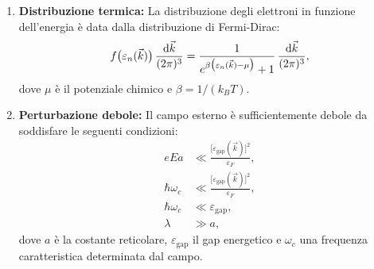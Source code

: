 \begin{enumerate}
    \item \textbf{Distribuzione termica:} La distribuzione degli elettroni in funzione dell'energia è data dalla distribuzione di Fermi-Dirac:
    \[
    f\bigl(\varepsilon_n(\vec{k})\bigr)\, \frac{\text{d}\vec{k}}{(2\pi)^3} = \frac{1}{e^{\beta\bigl(\varepsilon_n(\vec{k})-\mu\bigr)}+1}\, \frac{\text{d}\vec{k}}{(2\pi)^3},
    \]
    dove \(\mu\) è il potenziale chimico e \(\beta = 1/(k_BT)\).
    \item \textbf{Perturbazione debole:} Il campo esterno è sufficientemente debole da soddisfare le seguenti condizioni:
    \begin{equation}
        \begin{split}
            eEa &\ll \frac{\bigl[\varepsilon_{\text{gap}}(\vec{k})\bigr]^2}{\varepsilon_F},\\[1mm]
            \hbar\omega_c &\ll \frac{\bigl[\varepsilon_{\text{gap}}(\vec{k})\bigr]^2}{\varepsilon_F},\\[1mm]
            \hbar\omega_c &\ll \varepsilon_{\text{gap}},\\[1mm]
            \lambda &\gg a,
        \end{split}
    \end{equation}
    dove \(a\) è la costante reticolare, \(\varepsilon_{\text{gap}}\) il gap energetico e \(\omega_c\) una frequenza caratteristica determinata dal campo.
\end{enumerate}


